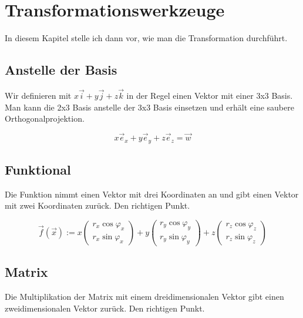 \documentclass[a4paper]{article}
\begin{document}
\section{Transformationswerkzeuge}

In diesem Kapitel stelle ich dann vor, wie man die Transformation durchf\"uhrt.

\subsection{Anstelle der Basis}

Wir definieren mit $x\vec{i}+y\vec{j}+z\vec{k}$ in der Regel einen Vektor mit einer 3x3 Basis. Man kann die 2x3 Basis anstelle der 3x3 Basis einsetzen und erh\"alt eine saubere Orthogonalprojektion.

\begin{displaymath}
x\vec{e}_{x} + y\vec{e}_{y} + z\vec{e}_{z} = \vec{w} 
\end{displaymath}



\subsection{Funktional}

Die Funktion nimmt einen Vektor mit drei Koordinaten an und gibt einen Vektor mit zwei Koordinaten zur\"uck. Den richtigen Punkt.

\begin{displaymath}
\vec{f}(\vec{x}) := x \begin{pmatrix}r_x \cos \varphi_x\\r_x \sin \varphi_x\end{pmatrix} +y  \begin{pmatrix}r_y \cos \varphi_y\\r_y \sin \varphi_y\end{pmatrix} +z  \begin{pmatrix}r_z \cos \varphi_z\\r_z \sin \varphi_z\end{pmatrix}
\end{displaymath}


\subsection{Matrix}

Die Multiplikation der Matrix mit einem dreidimensionalen Vektor gibt einen zweidimensionalen Vektor zur\"uck. Den richtigen Punkt.
\end{document}

